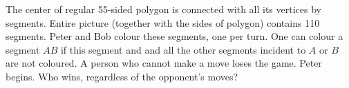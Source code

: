 \problem
The center of regular 55-sided polygon is connected with all its vertices by
segments.
Entire picture (together with the sides of polygon) contains 110 segments.
Peter and Bob colour these segments, one per turn.
One can colour a segment $AB$ if this segment and and all the other segments
incident to $A$ or $B$ are not coloured.
A person who cannot make a move loses the game.
Peter begins.
Who wins, regardless of the opponent's moves?
\solution
\endproblem
